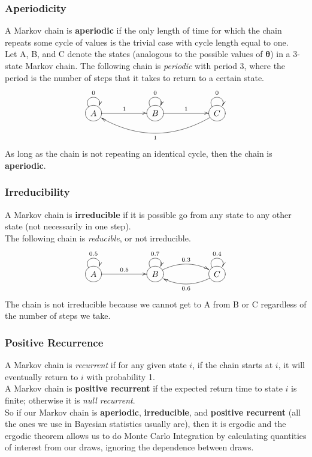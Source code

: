 \documentclass{beamer}
\begin{document}
\begin{frame}
\frametitle{Aperiodicity}
\pause
A Markov chain is \textbf{aperiodic} if the only length of time for
which the chain repeats some cycle of values is the trivial case with
cycle length equal to one.\\
\pause
\bigskip
Let A, B, and C denote the states (analogous to the possible values of
$\bm{\theta}$) in a 3-state Markov chain.  \pause The following chain
is \textit{periodic} with period 3, where the period is the number of
steps that it takes to return to a certain state.
\pause
$$
\xymatrix{
*++[o][F-]{A} \ar@(ul,ur)^0 \ar[rr]^1 && *++[o][F-]{B}
\ar@(ul,ur)^0 \ar[rr]^1 && *++[o][F-]{C} \ar@(ul,ur)^0 \ar@/^2pc/[llll]^1
}
$$
\pause
As long as the chain is not repeating an identical cycle, then the
chain is \textbf{aperiodic}.
\end{frame}

\begin{frame}
\frametitle{Irreducibility}
\pause
A Markov chain is \textbf{irreducible} if it is possible go from any state to
any other state (not necessarily in one step).\\
\bigskip
\pause
The following chain is \textit{reducible}, or not irreducible.
\pause
$$
\xymatrix{
*++[o][F-]{A} \ar@(ul,ur)^{0.5} \ar[rr]^{0.5} && *++[o][F-]{B}
\ar@(ul,ur)^{0.7} \ar@/^1pc/[rr]^{0.3} && *++[o][F-]{C} \ar@(ul,ur)^{0.4} \ar@/^1pc/[ll]^{0.6}
}
$$
\pause
The chain is not irreducible because we cannot get to A from B or C
regardless of the number of steps we take.
\end{frame}

\begin{frame}
\frametitle{Positive Recurrence}
\pause
A Markov chain is \textit{recurrent} if for any given state $i$, if
the chain starts at $i$, it will eventually return to $i$ with
probability 1. \\
\bigskip
\pause
A Markov chain is \textbf{positive recurrent} if the expected return
time to state $i$ is finite; \pause otherwise it is \textit{null recurrent}.\\
\pause
\bigskip
\bigskip
So if our Markov chain is \textbf{aperiodic}, \textbf{irreducible},
and \textbf{positive recurrent} (all the ones we use in
Bayesian statistics usually are), then it is ergodic and the ergodic
theorem allows us to do Monte Carlo Integration by calculating quantities of interest from our draws,
ignoring the dependence between draws.
\end{frame}
\end{document}
